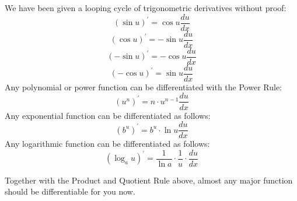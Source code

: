 We have been given a looping cycle of trigonometric derivatives without proof:
\begin{equation}
\left(\sin{u}\right)^\prime = \cos{u}\frac{du}{dx}
\end{equation}
\begin{equation}
\left(\cos{u}\right)^\prime = -\sin{u}\frac{du}{dx}
\end{equation}
\begin{equation}
\left(-\sin{u}\right)^\prime = -\cos{u}\frac{du}{dx}
\end{equation}
\begin{equation}
\left(-\cos{u}\right)^\prime = \sin{u}\frac{du}{dx}
\end{equation}
Any polynomial or power function can be differentiated with the Power Rule:
\begin{equation}
\left(u^n\right)^\prime = n\cdot{}u^{n-1}\frac{du}{dx}
\end{equation}
Any exponential function can be differentiated as follows:
\begin{equation}
(b^u)^\prime = b^u\cdot{}\ln{u}\frac{du}{dx}
\end{equation}
Any logarithmic function can be differentiated as follows:
\begin{equation}
\left(\log_a{u}\right)^\prime = \frac{1}{\ln{a}}\cdot{}\frac{1}{u}\cdot{}\frac{du}{dx}
\end{equation}

Together with the Product and Quotient Rule above, almost any major
function should be differentiable for you now.



